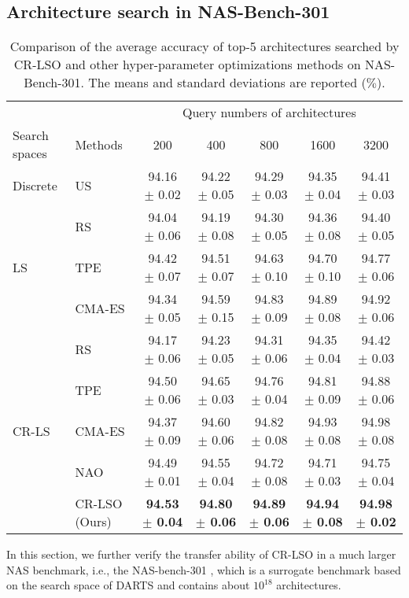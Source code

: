 \documentclass[10pt,twocolumn,letterpaper]{article}
\begin{document}
\subsection{Architecture search in NAS-Bench-301}
\begin{table*}[htbp]
	\centering
	\caption{Comparison of the average accuracy of top-5 architectures searched by CR-LSO and other hyper-parameter optimizations methods on NAS-Bench-301. The means and standard deviations are reported ($\%$).}
	\begin{tabular}{llccccc}
		\toprule
		{} & \textsc{{}} & \multicolumn{5}{c}{Query numbers of architectures}   \\
		\cline{3-7} \specialrule{0em}{1.5pt}{2.0pt}
		Search spaces & Methods &  200 & 400 & 800 & 1600 & 3200  \\
		\midrule
		Discrete & US & 94.16 $\pm$ 0.02 & 94.22 $\pm$ 0.05 & 94.29 $\pm$ 0.03 & 94.35 $\pm$ 0.04 & 94.41 $\pm$ 0.03 \\   
		\midrule
		\multirow{3}{*}{LS} & RS \cite{bergstra2012random} & 94.04 $\pm$ 0.06 & 94.19 $\pm$ 0.08 & 94.30 $\pm$ 0.05 & 94.36 $\pm$ 0.08 & 94.40 $\pm$ 0.05  \\
		{} & TPE \cite{bergstra2013making} & 94.42 $\pm$ 0.07 & 94.51 $\pm$ 0.07 & 94.63 $\pm$ 0.10 & 94.70 $\pm$ 0.10 & 94.77 $\pm$ 0.06 \\
		{} & CMA-ES \cite{nomura2021warm} & 94.34 $\pm$ 0.05 & 94.59 $\pm$ 0.15 & 94.83 $\pm$ 0.09 & 94.89 $\pm$ 0.08 & 94.92 $\pm$ 0.06 \\
		\midrule 
		\multirow{5}{*}{CR-LS} & RS \cite{bergstra2012random} & 94.17 $\pm$ 0.06 & 94.23 $\pm$ 0.05 & 94.31 $\pm$ 0.06 & 94.35 $\pm$ 0.04 & 94.42 $\pm$ 0.03 \\ 
		{} & TPE \cite{bergstra2013making} & 94.50 $\pm$ 0.06 & 94.65 $\pm$ 0.03 & 94.76 $\pm$ 0.04 & 94.81 $\pm$ 0.09 & 94.88 $\pm$ 0.06 \\ 
		{} & CMA-ES \cite{nomura2021warm} & 94.37 $\pm$ 0.09 & 94.60 $\pm$ 0.06 & 94.82 $\pm$ 0.08 & 94.93 $\pm$ 0.08 & 94.98 $\pm$  0.08 \\ 
		{} & NAO \cite{luo2018neural} & 94.49 $\pm$ 0.01 & 94.55 $\pm$ 0.04 & 94.72 $\pm$ 0.08 & 94.71 $\pm$ 0.03 & 94.75 $\pm$ 0.04 \\ 
		{} & CR-LSO (Ours) & \textbf{94.53 $\pm$ 0.04} & \textbf{94.80 $\pm$ 0.06} & \textbf{94.89 $\pm$ 0.06} & \textbf{94.94 $\pm$ 0.08} & \textbf{94.98 $\pm$ 0.02} \\ 
		\bottomrule
	\end{tabular}
	\label{tab:top-5_performance}
\end{table*}
In this section, we further verify the transfer ability of CR-LSO in a much larger NAS benchmark, i.e., the NAS-bench-301 \cite{siems2020bench}, which is a surrogate benchmark  based on the search space of DARTS \cite{liu2018darts} and contains about $10^{18}$ architectures.
\end{document}
